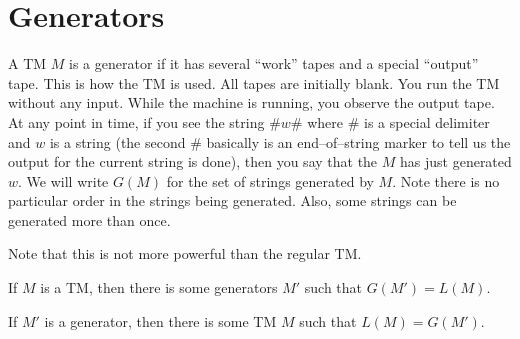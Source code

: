 \section{Generators}

A TM $M$ is a generator if it has several ``work'' tapes and a
special ``output'' tape. This is how the TM is used. All tapes are
initially blank. You run the TM without any input. While the
machine is running, you observe the output tape. At any point in
time, if you see the string $\#w\#$ where $\#$ is a special
delimiter and $w$ is a string 
(the second $\#$ basically is an end--of--string marker to tell us the 
output for the current string is done), then you say that the $M$ has just
generated $w$. We will write $G(M)$ for the set of strings
generated by $M$. Note there is no particular order in the strings
being generated. Also, some strings can be generated more than
once.

Note that this is not more powerful than
the regular TM.

\begin{thm}
\begin{tightlist}
\item If $M$ is a TM, then there is some generators $M'$ such that
$G(M') = L(M)$.
\item If $M'$ is a generator, then there is some TM $M$ such that
$L(M) = G(M')$.
\end{tightlist}
\end{thm}
